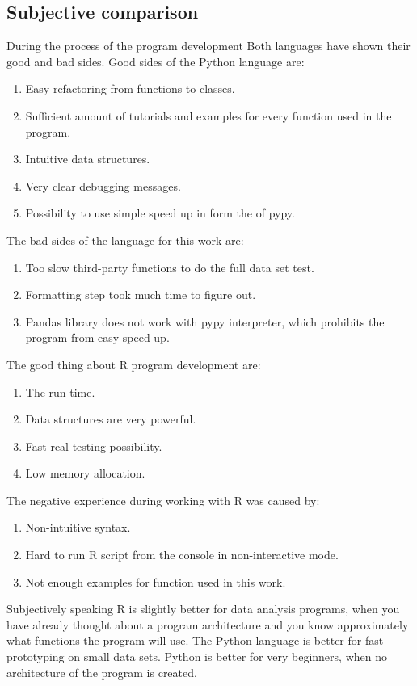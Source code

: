 \documentclass{article}
\begin{document}
\subsection{Subjective comparison}
During the process of the program development Both languages have shown their good and bad sides. Good sides of the Python language are:
\begin{enumerate}
    \item Easy refactoring from functions to classes.
    \item Sufficient amount of tutorials and examples for every function used in the program.
    \item Intuitive data structures.
    \item Very clear debugging messages.
    \item Possibility to use simple speed up in form the of pypy.
\end{enumerate}
The bad sides of the language for this work are:
\begin{enumerate}
    \item Too slow third-party functions to do the full data set test.
    \item Formatting step took much time to figure out.
    \item Pandas library does not work with pypy interpreter, which prohibits the program from easy speed up.
\end{enumerate} 
The good thing about R program development are:
\begin{enumerate}
    \item The run time.
    \item Data structures are very powerful.
    \item Fast real testing possibility.
    \item Low memory allocation.
\end{enumerate}
The negative experience during working with R was caused by:
\begin{enumerate}
    \item Non-intuitive syntax.
    \item Hard to run R script from the console in non-interactive mode.
    \item Not enough examples for function used in this work.
\end{enumerate} 
Subjectively speaking R is slightly better for data analysis programs, when you have already thought about a program architecture and you know approximately what functions the program will use. The Python language is better for fast prototyping on small data sets. Python is better for very beginners, when no architecture of the program is created.
  
\end{document}
